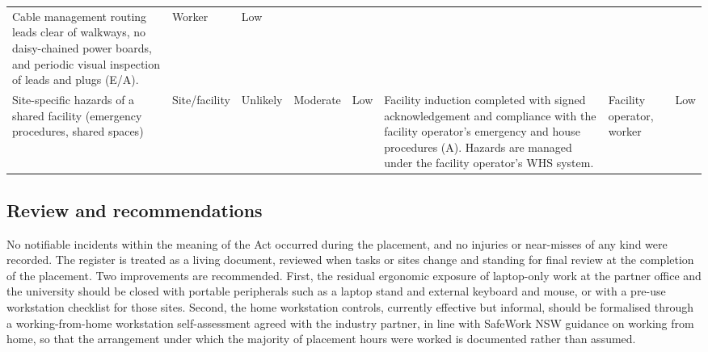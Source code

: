 \begin{table}[t]
\begin{tabular}{p{22mm} p{18mm} p{12mm} p{14mm} p{13mm} p{50mm} p{19mm} p{13mm}}
Cable management routing leads clear of walkways, no daisy-chained power
boards, and periodic visual inspection of leads and plugs (E/A). & Worker &
Low \\
\addlinespace
Site-specific hazards of a shared facility (emergency procedures, shared
spaces) & Site/facility & Unlikely & Moderate & Low & Facility induction
completed with signed acknowledgement and compliance with the facility
operator's emergency and house procedures (A). Hazards are managed under
the facility operator's WHS system. & Facility operator, worker & Low \\
\bottomrule
\end{tabular}
\end{table}

\subsection{Review and recommendations}
No notifiable incidents within the meaning of the Act occurred during the
placement, and no injuries or near-misses of any kind were recorded. The
register is treated as a living document, reviewed when tasks or sites
change and standing for final review at the completion of the placement.
Two improvements are recommended. First, the residual ergonomic exposure
of laptop-only work at the partner office and the university should be
closed with portable peripherals such as a laptop stand and external
keyboard and mouse, or with a pre-use workstation checklist for those
sites. Second, the home workstation controls, currently effective but
informal, should be formalised through a working-from-home workstation
self-assessment agreed with the industry partner, in line with SafeWork
NSW guidance on working from home, so that the arrangement under which the
majority of placement hours were worked is documented rather than assumed.